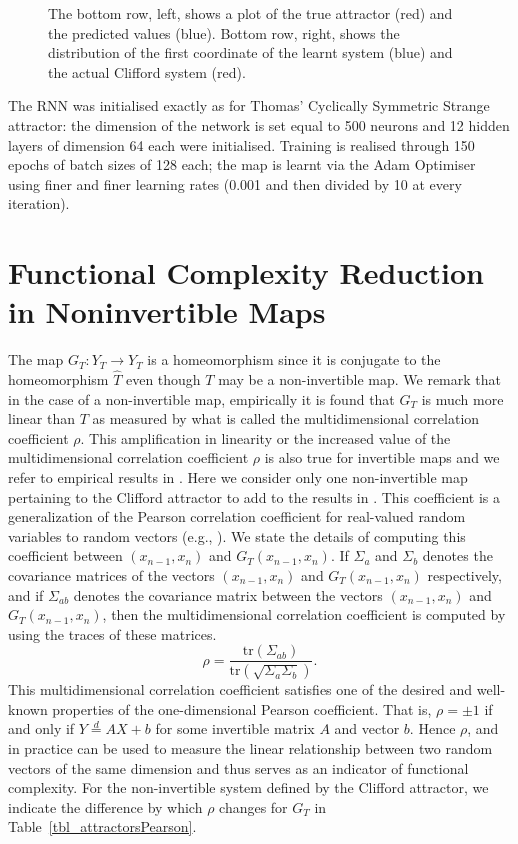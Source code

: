 \begin{figure}[ht]
  \endminipage
  \caption{The bottom row, left, shows a plot of the true attractor (red) and the predicted values (blue). Bottom row, right, shows the distribution of the first coordinate of the learnt system (blue) and the actual Clifford system (red). }
  \label{fig:Clifford}
\end{figure}

 The RNN was initialised exactly as for Thomas' Cyclically Symmetric Strange attractor: the dimension of the network is set equal to 500 neurons and 12 hidden layers of dimension 64 each were initialised. Training is realised through 150 epochs of batch sizes of 128 each; the map is learnt via the Adam Optimiser using finer and finer learning rates (0.001 and then divided by 10 at every iteration).

\section{Functional Complexity Reduction in Noninvertible Maps}
The map $G_T : Y_T \to Y_T$ is a homeomorphism since it is conjugate to the homeomorphism $\widehat{T}$ even though $T$ may be a non-invertible map. We remark that in the case of a non-invertible map, empirically it is found that $G_T$ is much more linear than $T$ as measured by what is called the multidimensional correlation coefficient $\rho$. This amplification in linearity  or the increased value of the multidimensional correlation coefficient $\rho$  is also true for invertible maps and we refer to empirical results in \cite{Supp}. Here we consider only one non-invertible map pertaining to the Clifford attractor to add to the results in \cite{Supp}. This coefficient is a generalization of the Pearson correlation coefficient for real-valued random variables to random vectors (e.g., \cite{puccetti2019measuring}). We state the details of computing this coefficient between 
$(x_{n-1},x_n)$ and $G_T(x_{n-1},x_n)$. 
If $\Sigma_{a}$ and $\Sigma_{b}$ denotes the covariance matrices of the vectors $(x_{n-1},x_n)$ and $G_T(x_{n-1},x_n)$ respectively, and if $\Sigma_{ab}$ denotes the covariance matrix between the vectors $(x_{n-1},x_n)$ and $G_T(x_{n-1},x_n)$, then the multidimensional correlation coefficient is computed by using the traces of these matrices.
\[
    \rho= \frac{\text{tr}({\Sigma_{ab}})}{\text{tr}({\sqrt{\Sigma_a\Sigma_b}})}.
\]
This multidimensional correlation coefficient satisfies one of the desired and well-known properties of the one-dimensional Pearson coefficient. That is, $\rho=\pm 1$ if and only if $Y\overset{d}{=}AX+b$ for some invertible matrix $A$ and vector $b$. Hence $\rho$, and in practice can be used  to measure the linear relationship between two random vectors of the same dimension and thus serves as an indicator of functional complexity. For the non-invertible system defined by the Clifford attractor, we indicate the difference by which $\rho$ changes for $G_T$ in Table~\ref{tbl_attractorsPearson}.
